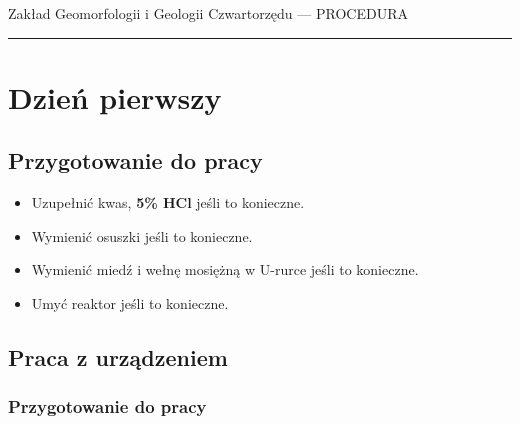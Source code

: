 \documentclass[
  letterpaper,
  DIV=11,
  numbers=noendperiod]{scrreprt}
\begin{document}
Zakład Geomorfologii i Geologii Czwartorzędu --- PROCEDURA

\begin{center}\rule{0.5\linewidth}{0.5pt}\end{center}

\hypertarget{dzieux144-pierwszy}{%
\section{Dzień pierwszy}\label{dzieux144-pierwszy}}

\hypertarget{przygotowanie-do-pracy-2}{%
\subsection{Przygotowanie do pracy}\label{przygotowanie-do-pracy-2}}

\begin{itemize}
\item
  Uzupełnić kwas, \textbf{5\% HCl} jeśli to konieczne.
\item
  Wymienić osuszki jeśli to konieczne.
\item
  Wymienić miedź i wełnę mosiężną w U-rurce jeśli to konieczne.
\item
  Umyć reaktor jeśli to konieczne.
\end{itemize}

\hypertarget{praca-z-urzux105dzeniem}{%
\subsection{Praca z urządzeniem}\label{praca-z-urzux105dzeniem}}

\hypertarget{przygotowanie-do-pracy-3}{%
\subsubsection{Przygotowanie do pracy}\label{przygotowanie-do-pracy-3}}
\end{document}
